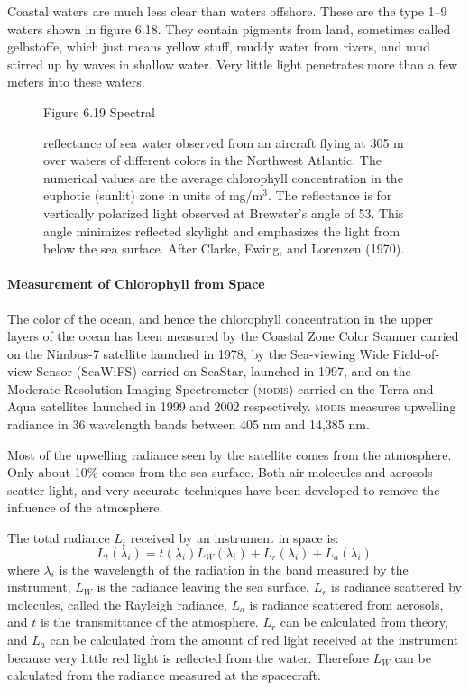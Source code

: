 Coastal waters are much less clear than waters offshore. These are the type
1--9 waters shown in figure 6.18. They contain pigments from land, sometimes
called gelbstoffe, which just means yellow stuff, muddy water from rivers, and
mud stirred up by waves in shallow water. Very little light penetrates more than
a few meters into these waters.

\begin{figure}[t!]
\footnotesize
Figure 6.19 Spectral \rule{0mm}{4ex}reflectance of sea water observed from an
aircraft flying at 305 m over waters of different colors in the Northwest
Atlantic. The numerical values are the average chlorophyll concentration in the
euphotic (sunlit) zone in units of mg/m$^3$. The reflectance is for vertically
polarized light observed at Brewster's angle of 53\degrees. This angle minimizes
reflected skylight and emphasizes the light from below the sea surface. After
Clarke, Ewing, and Lorenzen (1970).
\label{fig:reflectance}
\vspace{-3ex}
\end{figure}

\paragraph{Measurement of Chlorophyll from Space}The color of the ocean, and hence the chlorophyll concentration in the upper layers of the ocean has been measured by the Coastal Zone Color Scanner carried on the Nimbus-7 satellite launched in 1978, by the Sea-viewing Wide Field-of-view Sensor (SeaWiFS) carried on SeaStar, launched in 1997, and on the Moderate Resolution Imaging Spectrometer (\textsc{modis}) carried on the Terra and Aqua satellites launched in 1999 and 2002 respectively. \textsc{modis} measures upwelling radiance in 36 wavelength bands between 405 nm and 14,385 nm.

Most of the upwelling radiance seen by the satellite comes from the
atmosphere. Only about 10\% comes from the sea surface. Both air molecules
and aerosols scatter light, and very accurate techniques have been developed to
remove the influence of the atmosphere.

The total radiance $L_t$ received by an instrument in space is:
\begin{equation}
L_t(\lambda_i) = t(\lambda_i)L_W(\lambda_i)+L_r(\lambda_i)+L_a(\lambda_i)
\end{equation}
where $\lambda_i$ is the wavelength of the radiation in the band measured by the
instrument, $L_W$ is the radiance leaving the sea surface, $L_r$ is radiance
scattered by molecules, called the Rayleigh radiance, $L_a$ is radiance
scattered from aerosols, and $t$ is the transmittance of the atmosphere. $L_r$
can be calculated from theory, and $L_a$ can be calculated from the amount of red
light received at the instrument because very little red light is reflected from
the water. Therefore $L_W$ can be calculated from the radiance measured at the
spacecraft.

